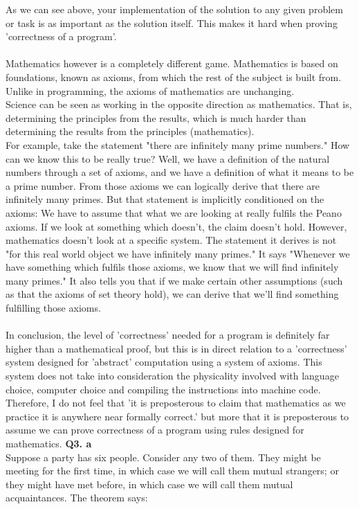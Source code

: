\documentclass[a4paper,12pt]{article}
\begin{document}
As we can see above, your implementation of the solution to any given problem or task is as important as the solution itself. This makes it hard when proving 'correctness of a program'. \\
\\
Mathematics however is a completely different game. Mathematics is based on foundations, known as axioms, from which the rest of the subject is built from.  Unlike in programming, the axioms of mathematics are unchanging. \\
Science can be seen as working in the opposite direction as mathematics. That is, determining the principles from the results, which is much harder than determining the results from the principles (mathematics).\\
For example, take the statement "there are infinitely many prime numbers." How can we know this to be really true? Well, we have a definition of the natural numbers through a set of axioms, and we have a definition of what it means to be a prime number. From those axioms we can logically derive that there are infinitely many primes. But that statement is implicitly conditioned on the axioms: We have to assume that what we are looking at really fulfils the Peano axioms. If we look at something which doesn't, the claim doesn't hold. However, mathematics doesn't look at a specific system. The statement it derives is not "for this real world object we have infinitely many primes." It says "Whenever we have something which fulfils those axioms, we know that we will find infinitely many primes." It also tells you that if we make certain other assumptions (such as that the axioms of set theory hold), we can derive that we'll find something fulfilling those axioms.\\
\\
In conclusion, the level of 'correctness' needed for a program is definitely far higher than a mathematical proof, but this is in direct relation to a 'correctness' system designed for 'abstract' computation using a system of axioms. This system does not take into consideration the physicality involved with language choice, computer choice and compiling the instructions into machine code. Therefore, I do not feel that 'it is preposterous to claim that mathematics as we practice it is anywhere near formally correct.' but more that it is preposterous to assume we can prove correctness of a program using rules designed for mathematics.
\newpage
\noindent \textbf{Q3. a} \\
Suppose a party has six people. Consider any two of them. They might be meeting for the first time, in which case we will call them mutual strangers; or they might have met before, in which case we will call them mutual acquaintances. The theorem says:
\end{document}
